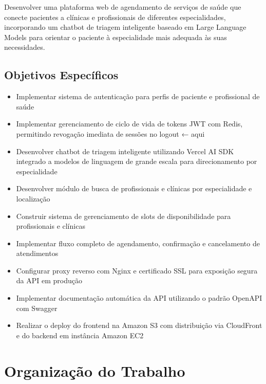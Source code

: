 Desenvolver uma plataforma web de agendamento de serviços de
saúde que conecte pacientes a clínicas e profissionais de
diferentes especialidades, incorporando um chatbot de triagem
inteligente baseado em Large Language Models para orientar
o paciente à especialidade mais adequada às suas necessidades.

\subsection{Objetivos Específicos}
\label{subsec:specific-objectives}

\begin{itemize}
  \item Implementar sistema de autenticação para
        perfis de paciente e profissional de saúde

  \item Implementar gerenciamento de ciclo de vida
        de tokens JWT com Redis, permitindo revogação
        imediata de sessões no logout        ← aqui

  \item Desenvolver chatbot de triagem inteligente
        utilizando Vercel AI SDK integrado a modelos
        de linguagem de grande escala para
        direcionamento por especialidade

  \item Desenvolver módulo de busca de profissionais
        e clínicas por especialidade e localização

  \item Construir sistema de gerenciamento de slots
        de disponibilidade para profissionais e
        clínicas

  \item Implementar fluxo completo de agendamento,
        confirmação e cancelamento de atendimentos

  \item Configurar proxy reverso com Nginx e
        certificado SSL para exposição segura da
        API em produção

  \item Implementar documentação automática da API
        utilizando o padrão OpenAPI com Swagger

  \item Realizar o deploy do frontend na Amazon S3
        com distribuição via CloudFront e do backend
        em instância Amazon EC2
\end{itemize}

\section{Organização do Trabalho}
\label{sec:organization}

